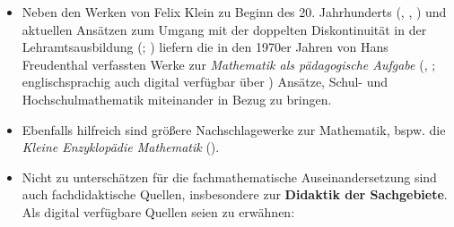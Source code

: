 \documentclass[
]{scrbook}
\theoremstyle{definition}
\theoremstyle{definition}
\theoremstyle{definition}
\theoremstyle{definition}
\theoremstyle{remark}
\begin{document}
\begin{itemize}
\item
  Neben den Werken von Felix Klein zu Beginn des 20. Jahrhunderts (, , ) und aktuellen Ansätzen zum Umgang mit der doppelten Diskontinuität in der Lehramtsausbildung (; ) liefern die in den 1970er Jahren von Hans Freudenthal verfassten Werke zur \emph{Mathematik als pädagogische Aufgabe} (, ; englischsprachig auch digital verfügbar über ) Ansätze, Schul- und Hochschulmathematik miteinander in Bezug zu bringen.
\item
  Ebenfalls hilfreich sind größere Nachschlagewerke zur Mathematik, bspw. die \emph{Kleine Enzyklopädie Mathematik} ().
\item
  Nicht zu unterschätzen für die fachmathematische Auseinandersetzung sind auch fachdidaktische Quellen, insbesondere zur \textbf{Didaktik der Sachgebiete}. Als digital verfügbare Quellen seien zu erwähnen:


\end{itemize}
\end{document}
